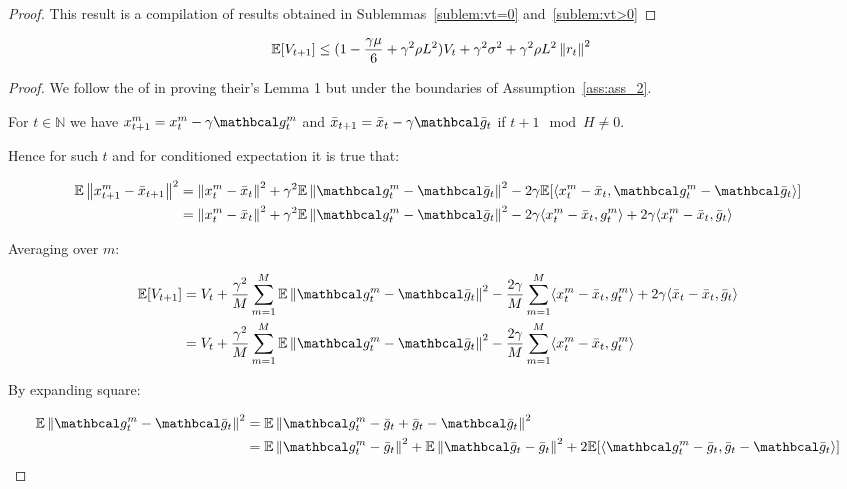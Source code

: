 \begin{proof}
    This result is a compilation of results obtained in Sublemmas~\ref{sublem:vt=0} and~\ref{sublem:vt>0}
\end{proof}

\begin{sublemma} \label{sublem:vt_base}
    \begin{align}
        \mathbb{E} [V_{t+1}]
        &\leq
        (1 - \frac {\gamma \mu}{6} + \gamma^2 \rho L^2) V_t
        +  \gamma^2 \sigma^2 + \gamma^2 \rho L^2 \left\|r_t\right\|^2
    \end{align}
\end{sublemma}

\begin{proof}
    We follow the of \cite{Khaled} in proving their's Lemma 1 but under the boundaries of Assumption~\ref{ass:ass_2}.

    For $t \in \mathbb{N}$ we have $x^m_{t+1} = x^m_t - \gamma \mc{g}^m_t$ 
    and $\bar{x}_{t+1} = \bar{x}_t - \gamma \mc{\bar{g}}_t$
    if $t + 1 \mod H \neq 0$. 
    
    Hence for such $t$ and for conditioned expectation it is true that:

    \begin{align}
        \E \norm{x^m_{t+1} - \bar{x}_{t+1}}^2 
        &= \norm{x^m_t - \bar{x}_t}^2 + \gamma^2 \E \norm{\mc{g}^m_t - \mc{\bar{g}}_t}^2 - 2\gamma \E [\inner{x^m_t - \bar{x}_t}{\mc{g}^m_t - \mc{\bar{g}}_t}] \\
        &= \norm{x^m_t - \bar{x}_t}^2 + \gamma^2 \E \norm{\mc{g}^m_t - \mc{\bar{g}}_t}^2 - 2\gamma \inner{x^m_t - \bar{x}_t}{g^m_t} + 2\gamma \inner {x^m_t - \bar{x}_t}{\bar{g}_t}
    \end{align}

    Averaging over $m$:

    \begin{align}
        \E [V_{t+1}] 
        &=
        V_t + \frac{\gamma^2}{M} \summ{m=1}{M} \E \norm{\mc{g}^m_t - \mc{\bar{g}}_t}^2 - \frac{2\gamma}{M} \summ{m=1}{M} \inner{x^m_t - \bar{x}_t}{g^m_t} + 2\gamma \inner {\bar{x}_t - \bar{x}_t}{\bar{g}_t}  \\
        &=
        V_t + \frac{\gamma^2}{M} \summ{m=1}{M} \E \norm{\mc{g}^m_t - \mc{\bar{g}}_t}^2 - \frac{2\gamma}{M} \summ{m=1}{M} \inner{x^m_t - \bar{x}_t}{g^m_t} \label{eq:1904_4}
    \end{align}

    By expanding square:

    \begin{align} 
        \E \norm{\mc{g}^m_t - \mc{\bar{g}}_t}^2
        &= \E \norm{\mc{g}^m_t - \bar{g}_t + \bar{g}_t - \mc{\bar{g}}_t}^2 \\
        &= 
        \E \norm{\mc{g}^m_t - \bar{g}_t}^2 + \E \norm{\mc{\bar{g}}_t - \bar{g}_t}^2 + 2\E [\inner{\mc{g}^m_t - \bar{g}_t}{\bar{g}_t - \mc{\bar{g}}_t}] \label{eq:1904_1}
    \end{align}


\end{proof}
